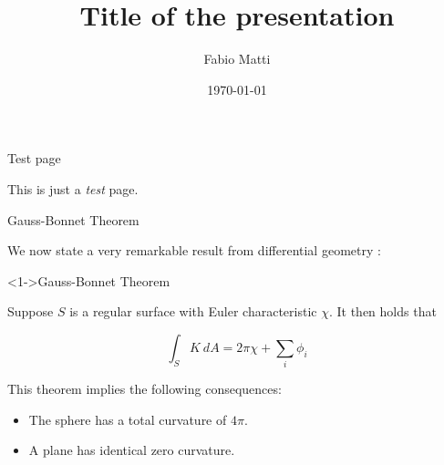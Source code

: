 \documentclass{beamer}
\title{Title of the presentation}
\date{\today}
\author{Fabio Matti}
\begin{document}
\begin{frame}[noframenumbering]

    \titlepage

\end{frame}

\begin{frame}{Test page}

    This is just a \emph{test} page.

\end{frame}

\begin{frame}{Gauss-Bonnet Theorem}

    We now state a very remarkable result from differential geometry \cite{article2021}:

    \begin{block}<1->{Gauss-Bonnet Theorem}

        Suppose $S$ is a regular surface with Euler characteristic $\chi$.
        It then holds that

        \begin{equation}
            \int_S K~dA = 2\pi\chi + \sum_i \phi_i
            \label{equ:gauss-bonnet}
        \end{equation}

    \end{block}

    This theorem implies the following consequences:

    \begin{itemize}
        \item<2-> The sphere has a total curvature of $4\pi$.
        \item<3-> A plane has identical zero curvature.
    \end{itemize}

\end{frame}
\end{document}
